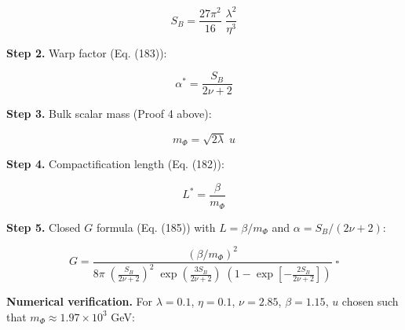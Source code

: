 \documentclass[
  11pt,
]{article}
\begin{document}
\[S_B = \frac{27\pi^2}{16}\;\frac{\lambda^2}{\eta^3} \tag{83}\]

\textbf{Step 2.} Warp factor (Eq. (183)):

\[\alpha^* = \frac{S_B}{2\nu + 2} \tag{84}\]

\textbf{Step 3.} Bulk scalar mass (Proof 4 above):

\[m_\Phi = \sqrt{2\lambda}\;u \tag{85}\]

\textbf{Step 4.} Compactification length (Eq. (182)):

\[L^* = \frac{\beta}{m_\Phi} \tag{86}\]

\textbf{Step 5.} Closed \(G\) formula (Eq. (185)) with
\(L = \beta/m_\Phi\) and \(\alpha = S_B/(2\nu+2)\):

\[G = \frac{(\beta/m_\Phi)^2}{8\pi\;\left(\frac{S_B}{2\nu+2}\right)^2\;\exp\!\left(\frac{3S_B}{2\nu+2}\right)\;\left(1 - \exp\!\left[-\frac{2S_B}{2\nu+2}\right]\right)} \;\square \tag{87}\]

\textbf{Numerical verification.} For \(\lambda = 0.1\), \(\eta = 0.1\),
\(\nu = 2.85\), \(\beta = 1.15\), \(u\) chosen such that
\(m_\Phi \approx 1.97 \times 10^3\) GeV:
\end{document}

